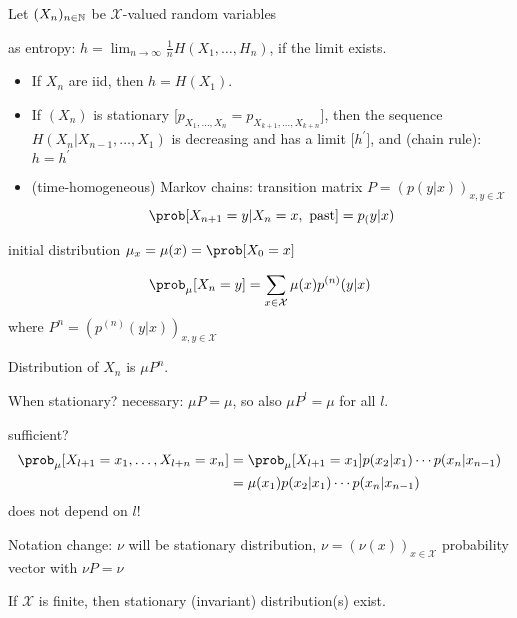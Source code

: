 \documentclass[mfit.tex]{subfiles}
\begin{document}
Let $(X_n)_{n \in \mathbb{N}}$ be $\mathcal{X}$-valued random variables

as entropy: $h = \lim_{n\to \infty} \frac{1}{n} H(X_1,\dots,H_n)$, if the limit exists.
\begin{itemize}
  \item If $X_n$ are iid, then $h = H(X_1)$.
  \item If $(X_n)$ is stationary [$p_{X_1,\dots,X_n} = p_{X_{k+1},\dots,X_{k+n}}$],
  then the sequence $H(X_n|X_{n-1},\dots,X_1)$ is decreasing and has a limit [$h^\prime$], and (chain rule): $h = h^\prime$
  \item (time-homogeneous) Markov chains:
  transition matrix $P = (p(y|x))_{x,y\in \mathcal{X}}$
  \[ \prob[X_{n+1} = y | X_n = x, \text{ past}] = p_(y|x) \]
\end{itemize}

initial distribution $\mu_x = \mu(x) = \prob[X_0 = x]$

\begin{align*}
  \prob_\mu[X_n = y] = \sum_{x \in \mathcal{X}} \mu(x) p^{(n)}(y|x)
\end{align*}
where $P^n = (p^{(n)}(y|x))_{x,y\in \mathcal{X}}$

Distribution of $X_n$ is $\mu P^n$.

When stationary? necessary: $\mu P = \mu$,
so also $\mu P^l = \mu$ for all $l$.

sufficient? 
\begin{align*}
  \prob_\mu [X_{l+1}=x_1,\dots,X_{l+n}=x_n] &= \prob_\mu[X_{l+1}=x_1] p(x_2|x_1) \cdots p(x_n|x_{n-1}) \\
  &= \mu(x_1) p(x_2|x_1) \cdots p(x_n|x_{n-1})
\end{align*}
does not depend on $l$!

Notation change: $\nu$ will be stationary distribution, $\nu = (\nu(x))_{x \in \mathcal{X}}$ probability vector
with $\nu P = \nu$

\begin{lemma}
  If $\mathcal{X}$ is finite, then stationary (invariant) distribution(s) exist.
\end{lemma}
\end{document}
